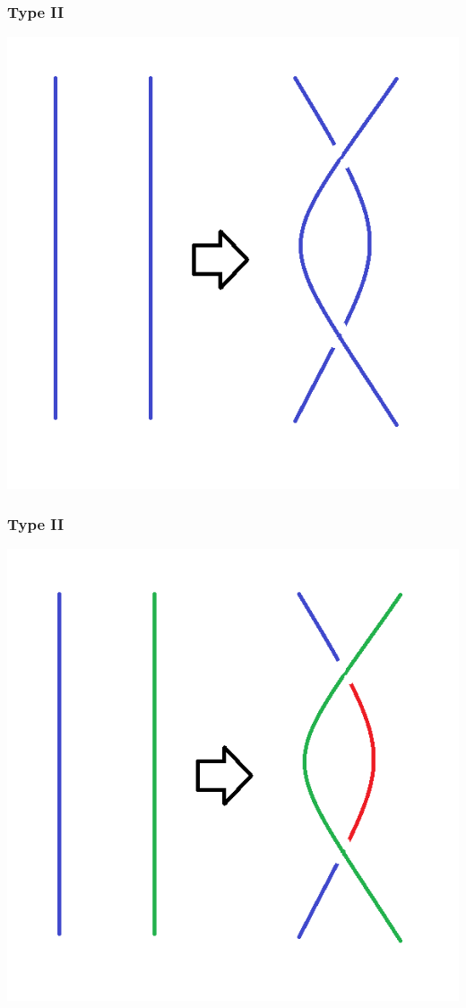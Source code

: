 \documentclass{beamer}
\begin{document}
\begin{frame}
  \frametitle{Type II}
  \begin{center}
    \includegraphics[scale=.4]{t2-c1}
  \end{center}
\end{frame}

\begin{frame}
  \frametitle{Type II}
  \begin{center}
    \includegraphics[scale=.4]{t2-c2}
  \end{center}
\end{frame}
\end{document}
